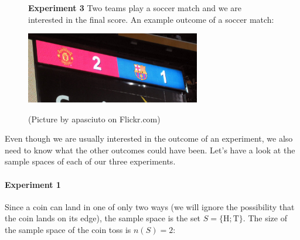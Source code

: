\begin{figure}[H]
  \textbf{Experiment 3} Two teams play a soccer match and we are
  interested in the final score. An example outcome of a soccer match:

  \begin{center}
    \includegraphics[width=3in]{Gr10-Probability-images/5996076302_412ec8d8d0_o.jpg}
 \\
  \begin{caption*}{(Picture by apasciuto on Flickr.com)}\end{caption*}
 \end{center}
\end{figure}


Even though we are usually interested in the outcome of an experiment,
we also need to know what the other outcomes could have been. Let's
have a look at the sample spaces of each of our three experiments.

\paragraph{Experiment 1} Since a coin can land in one of only two ways
(we will ignore the possibility that the coin lands on its edge), the
sample space is the set \(S=\{\textrm{H}; \textrm{T}\}\). The size of the sample space of the coin toss
is \(n(S)=2\):

\begin{figure}[H]
  \begin{center}
  \end{center}
\end{figure} 

